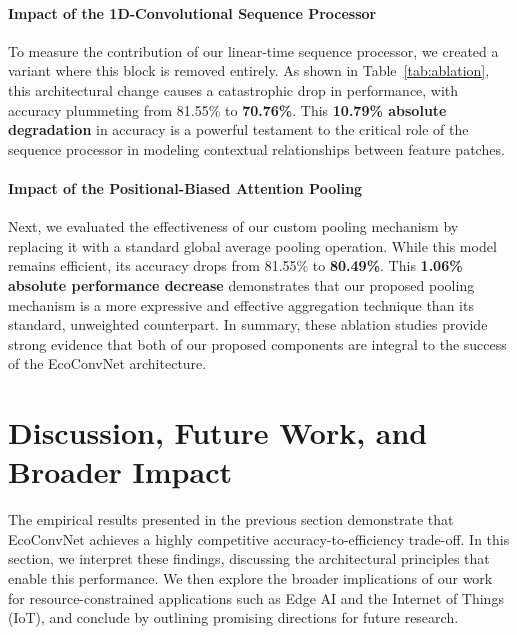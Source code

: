 \documentclass[12pt, a4paper]{article}
\begin{document}
\paragraph{Impact of the 1D-Convolutional Sequence Processor}
To measure the contribution of our linear-time sequence processor, we created a variant where this block is removed entirely. As shown in Table~\ref{tab:ablation}, this architectural change causes a catastrophic drop in performance, with accuracy plummeting from 81.55\% to \textbf{70.76\%}. This \textbf{10.79\% absolute degradation} in accuracy is a powerful testament to the critical role of the sequence processor in modeling contextual relationships between feature patches.

\paragraph{Impact of the Positional-Biased Attention Pooling}
Next, we evaluated the effectiveness of our custom pooling mechanism by replacing it with a standard global average pooling operation. While this model remains efficient, its accuracy drops from 81.55\% to \textbf{80.49\%}. This \textbf{1.06\% absolute performance decrease} demonstrates that our proposed pooling mechanism is a more expressive and effective aggregation technique than its standard, unweighted counterpart. In summary, these ablation studies provide strong evidence that both of our proposed components are integral to the success of the EcoConvNet architecture.




\section{Discussion, Future Work, and Broader Impact}
\label{sec:discussion}

The empirical results presented in the previous section demonstrate that EcoConvNet achieves a highly competitive accuracy-to-efficiency trade-off. In this section, we interpret these findings, discussing the architectural principles that enable this performance. We then explore the broader implications of our work for resource-constrained applications such as Edge AI and the Internet of Things (IoT), and conclude by outlining promising directions for future research.
\end{document}
